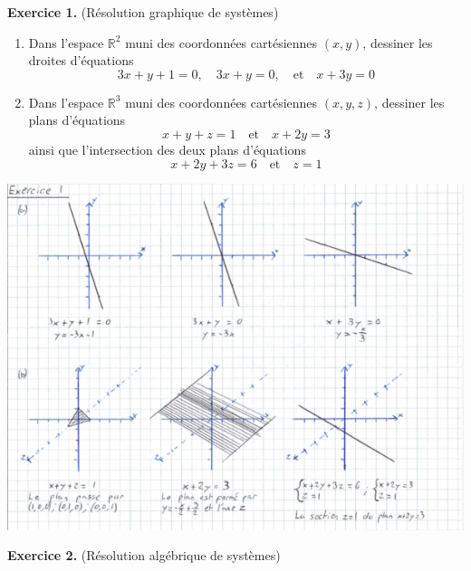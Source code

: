 \documentclass[a4paper, 10pt]{report}
\begin{document}
		
	\renewcommand{\headrule}{
	\color{lightgray} \par\noindent\rule{\textwidth}{2pt}
	}	
	\pagestyle{fancy}
	\fancyhf{}
	
	
	\noindent \textbf{Exercice 1.} (Résolution graphique de systèmes)
	
	\begin{enumerate}[label=(\alph*)]
		\item Dans l'espace $\mathbb{R}^2$ muni des coordonnées cartésiennes $(x, y)$, dessiner les droites d'équations
	$$
		3x + y + 1 = 0, \quad 3x + y = 0, \quad \text{et} \quad x + 3y = 0
	$$
	
		\item Dans l'espace $\mathbb{R}^3$ muni des coordonnées cartésiennes $(x, y, z)$, dessiner les plans d'équations
	$$
	x + y + z = 1 \quad \text{et} \quad x + 2y = 3
	$$
	ainsi que l'intersection des deux plans d'équations
	$$
	x + 2y + 3z = 6 \quad \text{et} \quad z = 1
	$$
	\end{enumerate}

	\includegraphics{ex01.png}
	
	\newpage
	\fancyhf{}
	\renewcommand{\headrule}{\rule{\textwidth}{0pt}}
	\noindent \textbf{Exercice 2.} (Résolution algébrique de systèmes)
	
\end{document}
